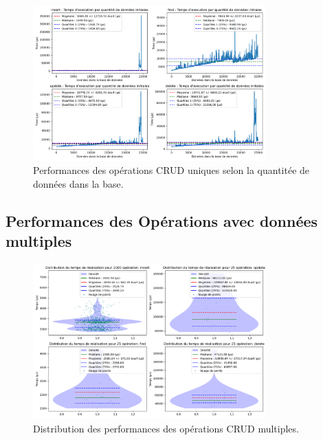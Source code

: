 \documentclass[12pt,a4paper]{report}
\begin{document}
        \begin{figure}[H]
            \centering
            \includegraphics[width=0.8\textwidth]{../plots/MongoDB/replica_set/test_one_various_data.png}
            \caption{Performances des opérations CRUD uniques selon la quantitée de données dans la base.}
            \label{fig:mongo_replica_one_various}
        \end{figure}

    \subsection{Performances des Opérations avec données multiples}

        \begin{figure}[H]
            \centering
            \includegraphics[width=0.8\textwidth]{../plots/MongoDB/replica_set/global_test_many.png}
            \caption{Distribution des performances des opérations CRUD multiples.}
            \label{fig:mongo_replica_global_many}
        \end{figure}
\end{document}
